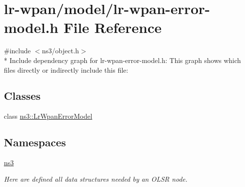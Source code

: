 \hypertarget{lr-wpan-error-model_8h}{}\section{lr-\/wpan/model/lr-\/wpan-\/error-\/model.h File Reference}
\label{lr-wpan-error-model_8h}
{\ttfamily \#include $<$ns3/object.\+h$>$}\\*
Include dependency graph for lr-\/wpan-\/error-\/model.h\+:
This graph shows which files directly or indirectly include this file\+:
\subsection*{Classes}
\begin{DoxyCompactItemize}
\item 
class \hyperlink{classns3_1_1LrWpanErrorModel}{ns3\+::\+Lr\+Wpan\+Error\+Model}
\end{DoxyCompactItemize}
\subsection*{Namespaces}
\begin{DoxyCompactItemize}
\item 
 \hyperlink{namespacens3}{ns3}
\begin{DoxyCompactList}\small\item\em Here are defined all data structures needed by an O\+L\+SR node. \end{DoxyCompactList}\end{DoxyCompactItemize}
